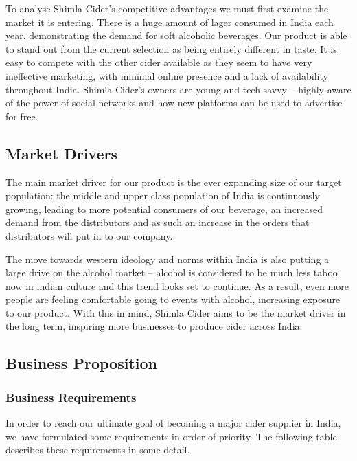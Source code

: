 \documentclass[11pt]{article}
\begin{document}
To analyse Shimla Cider's competitive advantages we must first examine the
market it is entering. There is a huge amount of lager consumed in India
each year, demonstrating the demand for soft alcoholic beverages. Our product
is able to stand out from the current selection as being entirely different
in taste. It is easy to compete with the other cider available as they seem
to have very ineffective marketing, with minimal online presence and a lack
of availability throughout India. Shimla Cider's owners are young and tech
savvy -- highly aware of the power of social networks and how new platforms
can be used to advertise for free. 

\subsection{Market Drivers}

The main market driver for our product is the ever expanding size of our
target population: the middle and upper class population of India is
continuously growing, leading to more potential consumers of our beverage,
an increased demand from the distributors and as such an increase in the
orders that distributors will put in to our company.

The move towards western ideology and norms within India is also putting a
large drive on the alcohol market -- alcohol is considered to be much less
taboo now in indian culture and this trend looks set to continue. As a
result, even more people are feeling comfortable going to events with
alcohol, increasing exposure to our product. With this in mind, Shimla Cider
aims to be the market driver in the long term, inspiring more businesses to
produce cider across India.

  \subsection{Business Proposition}

  \subsubsection{Business Requirements}
In order to reach our ultimate goal of becoming a major cider supplier in 
India, we have formulated some requirements in order of priority. The following
table describes these requirements in some detail.
\end{document}
